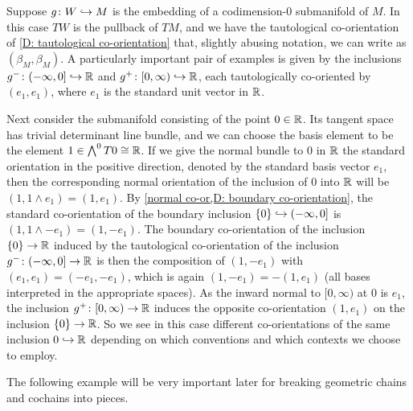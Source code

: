 \begin{example}\label{E: splitting example 1}
	Suppose $g \colon W \hookrightarrow M$ is the embedding of a codimension-$0$ submanifold of $M$.
	In this case $TW$ is the pullback of $TM$, and we have the tautological co-orientation of \cref{D: tautological co-orientation} that, slightly abusing notation, we can write as $(\beta_M,\beta_M)$.
	A particularly important pair of examples is given by the inclusions $g^- \colon (-\infty, 0] \hookrightarrow \mathbb{R}$ and $g^+ \colon [0,\infty) \hookrightarrow \mathbb{R}$, each tautologically co-oriented by $(e_1,e_1)$, where $e_1$ is the standard unit vector in $\mathbb{R}$.

	Next consider the submanifold consisting of the point $0 \in \mathbb{R}$.
	Its tangent space has trivial determinant line bundle, and we can choose the basis element to be the element $1 \in \bigwedge^0 T0 \cong \mathbb{R}$.
	If we give the normal bundle to $0$ in $\mathbb{R}$ the standard orientation in the positive direction, denoted by the standard basis vector $e_1$, then the corresponding normal orientation of the inclusion of $0$ into $\mathbb{R}$ will be $(1, 1 \wedge e_1) = (1, e_1)$.
	By \cref{normal co-or,D: boundary co-orientation}, the standard co-orientation of the boundary inclusion $\{0\} \hookrightarrow (-\infty, 0]$ is $(1, 1 \wedge -e_1) = (1, -e_1)$.
	The boundary co-orientation of the inclusion $\{0\} \to \mathbb{R}$ induced by the tautological co-orientation of the inclusion $g^- \colon (-\infty, 0] \to \mathbb{R}$ is then the composition of $(1, -e_1)$ with $(e_1, e_1)=(-e_1,-e_1)$, which is again $(1,-e_1) = -(1,e_1)$ (all bases interpreted in the appropriate spaces).
	As the inward normal to $[0,\infty)$ at $0$ is $e_1$, the inclusion $g^+ \colon [0,\infty) \to \mathbb{R}$ induces the opposite co-orientation $(1, e_1)$ on the inclusion $\{0\} \to \mathbb{R}$.
	So we see in this case different co-orientations of the same inclusion $0\hookrightarrow \mathbb{R}$ depending on which conventions and which contexts we choose to employ.
\end{example}

The following example will be very important later for breaking geometric chains and cochains into pieces.

